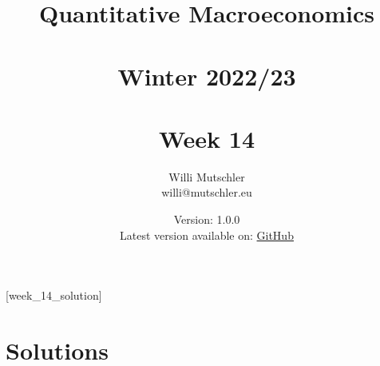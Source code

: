 
\newif\ifDisplaySolutions\DisplaySolutionstrue


\title{Quantitative Macroeconomics\\~\\Winter 2022/23\\~\\Week 14}
\author{Willi Mutschler\\willi@mutschler.eu}
\date{Version: 1.0.0\\Latest version available on: \href{https://github.com/wmutschl/Quantitative-Macroeconomics/releases/latest/download/week_14.pdf}{GitHub}}
\maketitle\thispagestyle{empty}

\newpage
{}[week_14_solution]
\tableofcontents\thispagestyle{empty}\newpage

\setcounter{page}{1}
\newpage
\newpage
\printbibliography

\ifDisplaySolutions
\newpage
\appendix

\section{Solutions}

\fi
